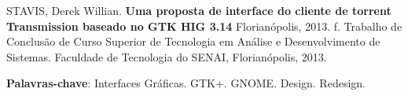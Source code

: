 
\noindent
STAVIS, Derek Willian. \textbf{Uma proposta de interface do cliente de torrent Transmission baseado no GTK HIG 3.14}
Florianópolis, 2013. \pageref{nropaginas}f. Trabalho de Conclusão de Curso Superior de Tecnologia em
Análise e Desenvolvimento de Sistemas. Faculdade de Tecnologia do
SENAI, Florianópolis, 2013.

\vspace{1cm}
\setlength{\absparsep}{18pt} %
\begin{resumo}
 \textbf{Palavras-chave}: Interfaces Gráficas. GTK+. GNOME. Design. Redesign.
\end{resumo}
